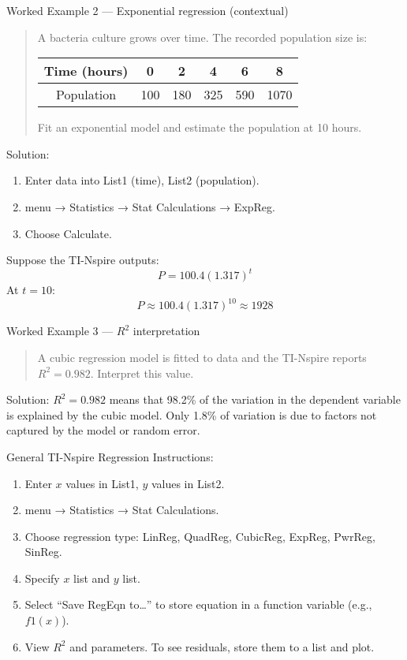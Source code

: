 \documentclass[11pt]{article}
\def\textbf#1{#1}%
\def\texttt#1{#1}%
\begin{document}
\textbf{Worked Example 2 — Exponential regression (contextual)}
\begin{quote}
A bacteria culture grows over time. The recorded population size is:

\begin{center}
\begin{tabular}{c|ccccc}
Time (hours) & 0 & 2 & 4 & 6 & 8 \\
\hline
Population & 100 & 180 & 325 & 590 & 1070 \\
\end{tabular}
\end{center}

Fit an exponential model and estimate the population at 10 hours.
\end{quote}

\textbf{Solution:}
\begin{enumerate}
    \item Enter data into \texttt{List1} (time), \texttt{List2} (population).
    \item \texttt{menu} → \texttt{Statistics} → \texttt{Stat Calculations} → \texttt{ExpReg}.
    \item Choose \texttt{Calculate}.
\end{enumerate}
Suppose the TI-Nspire outputs:
\[
P = 100.4(1.317)^t
\]
At $t = 10$:
\[
P \approx 100.4(1.317)^{10} \approx 1928
\]

\textbf{Worked Example 3 — $R^2$ interpretation}
\begin{quote}
A cubic regression model is fitted to data and the TI-Nspire reports $R^2 = 0.982$.
Interpret this value.
\end{quote}

\textbf{Solution:}
$R^2 = 0.982$ means that 98.2\% of the variation in the dependent variable is explained by the cubic model. Only 1.8\% of variation is due to factors not captured by the model or random error.

\textbf{General TI-Nspire Regression Instructions:}
\begin{enumerate}
    \item Enter $x$ values in \texttt{List1}, $y$ values in \texttt{List2}.
    \item \texttt{menu} → \texttt{Statistics} → \texttt{Stat Calculations}.
    \item Choose regression type: \texttt{LinReg}, \texttt{QuadReg}, \texttt{CubicReg}, \texttt{ExpReg}, \texttt{PwrReg}, \texttt{SinReg}.
    \item Specify $x$ list and $y$ list.
    \item Select “Save RegEqn to…” to store equation in a function variable (e.g., $f1(x)$).
    \item View $R^2$ and parameters. To see residuals, store them to a list and plot.
\end{enumerate}
\end{document}
